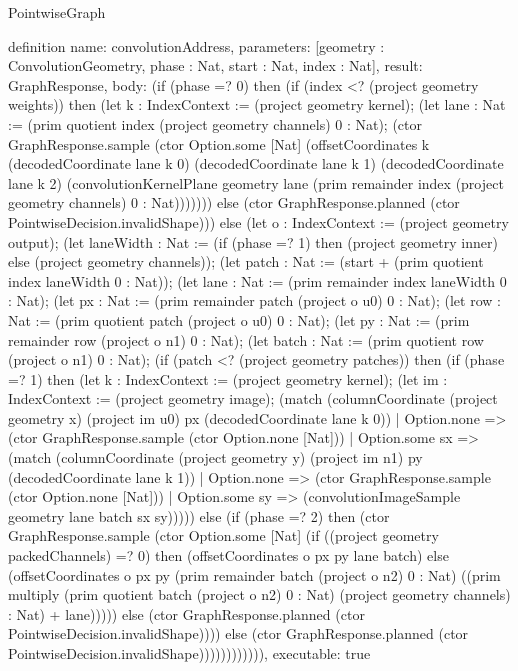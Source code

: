 \begin{lexlean}{PointwiseGraph}
\begin{semanticmodule}
definition{
  name: convolutionAddress,
  parameters: [geometry : ConvolutionGeometry, phase : Nat, start : Nat, index : Nat],
  result: GraphResponse,
  body: (if (phase =? 0) then (if (index <? (project geometry weights)) then (let k : IndexContext := (project geometry kernel); (let lane : Nat := (prim quotient index (project geometry channels) 0 : Nat); (ctor GraphResponse.sample (ctor Option.some [Nat] (offsetCoordinates k (decodedCoordinate lane k 0) (decodedCoordinate lane k 1) (decodedCoordinate lane k 2) (convolutionKernelPlane geometry lane (prim remainder index (project geometry channels) 0 : Nat))))))) else (ctor GraphResponse.planned (ctor PointwiseDecision.invalidShape))) else (let o : IndexContext := (project geometry output); (let laneWidth : Nat := (if (phase =? 1) then (project geometry inner) else (project geometry channels)); (let patch : Nat := (start + (prim quotient index laneWidth 0 : Nat)); (let lane : Nat := (prim remainder index laneWidth 0 : Nat); (let px : Nat := (prim remainder patch (project o u0) 0 : Nat); (let row : Nat := (prim quotient patch (project o u0) 0 : Nat); (let py : Nat := (prim remainder row (project o n1) 0 : Nat); (let batch : Nat := (prim quotient row (project o n1) 0 : Nat); (if (patch <? (project geometry patches)) then (if (phase =? 1) then (let k : IndexContext := (project geometry kernel); (let im : IndexContext := (project geometry image); (match (columnCoordinate (project geometry x) (project im u0) px (decodedCoordinate lane k 0))
    | Option.none => (ctor GraphResponse.sample (ctor Option.none [Nat]))
    | Option.some sx => (match (columnCoordinate (project geometry y) (project im n1) py (decodedCoordinate lane k 1))
      | Option.none => (ctor GraphResponse.sample (ctor Option.none [Nat]))
      | Option.some sy => (convolutionImageSample geometry lane batch sx sy))))) else (if (phase =? 2) then (ctor GraphResponse.sample (ctor Option.some [Nat] (if ((project geometry packedChannels) =? 0) then (offsetCoordinates o px py lane batch) else (offsetCoordinates o px py (prim remainder batch (project o n2) 0 : Nat) ((prim multiply (prim quotient batch (project o n2) 0 : Nat) (project geometry channels) : Nat) + lane))))) else (ctor GraphResponse.planned (ctor PointwiseDecision.invalidShape)))) else (ctor GraphResponse.planned (ctor PointwiseDecision.invalidShape)))))))))))),
  executable: true
}


\end{semanticmodule}
\end{lexlean}
